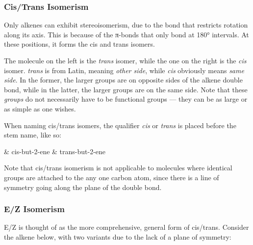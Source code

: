 	\subsubsection{Cis/Trans Isomerism}

		Only alkenes can exhibit stereoisomerism, due to the  bond that restricts rotation along its axis. This is because of the
		π-bonds that only bond at 180° intervals. At these positions, it forms the cis and trans isomers.


		The molecule on the left is the \textit{trans} isomer, while the one on the right is the \textit{cis} isomer. \textit{trans}
		is from Latin, meaning \textit{other side}, while \textit{cis} obviously means \textit{same side}. In the former,
		the larger groups are on opposite sides of the alkene double bond, while in the latter, the larger groups are on the same
		side. Note that these \textit{groups} do not necessarily have to be functional groups –– they can be as large or as simple
		as one wishes.

		When naming cis/trans isomers, the qualifier \textit{cis} or \textit{trans} is placed before the stem name, like so:
		\begin{bulletlist}
			& cis-but-2-ene
			& trans-but-2-ene
		\end{bulletlist}

		Note that cis/trans isomerism is not applicable to molecules where identical groups are attached to the any one carbon atom,
		since there is a line of symmetry going along the plane of the double bond.






	\pagebreak

	\subsubsection{E/Z Isomerism}

		E/Z is thought of as the more comprehensive, general form of cis/trans. Consider the alkene below, with two variants
		due to the lack of a plane of symmetry:

